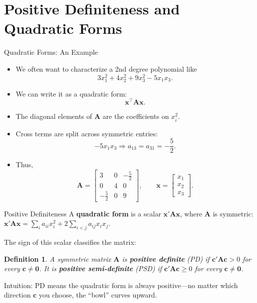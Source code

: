 \documentclass[aspectratio=169, handout, t]{beamer}
\newtheorem{defn}{Definition}
\numberwithin{equation}{section}
\begin{document}
\section[Pos. Definite]{Positive Definiteness and Quadratic Forms}


\begin{frame}{Quadratic Forms: An Example}
\begin{itemize}
\item We often want to characterize a 2nd degree polynomial like
\[
3x_1^2 + 4x_2^2 + 9x_3^2 - 5x_1x_3.
\]

\item We can write it as a quadratic form:
\[
\bm{x}^\top \bm{A} \bm{x}.
\]

\item The diagonal elements of $\bm{A}$ are the coefficients on $x_i^2$.

\item Cross terms are split across symmetric entries:
\[
-5x_1x_3 \Rightarrow a_{13}=a_{31}=-\frac{5}{2}.
\]

\item Thus,
\[
\bm{A}=
\begin{bmatrix}
3 & 0 & -\frac{5}{2} \\
0 & 4 & 0 \\
-\frac{5}{2} & 0 & 9
\end{bmatrix},
\qquad
\bm{x}=
\begin{bmatrix}
x_1\\
x_2\\
x_3
\end{bmatrix}.
\]

\end{itemize}
\end{frame}

\begin{frame}{Positive Definiteness}
A \textbf{quadratic form} is a scalar $\bm{x}'\bm{A}\bm{x}$, where $\bm{A}$ is symmetric:
$\bm{x}'\bm{A}\bm{x}=\sum_i a_{ii}x_i^2+2\sum_{i<j} a_{ij}x_ix_j.$\pause

The sign of this scalar classifies the matrix:
\begin{defn}
A symmetric matrix $\bm{A}$ is \textbf{positive definite} (PD) if
$\bm{c}'\bm{A}\bm{c}>0$ for every $\bm{c}\neq \bm{0}$.
It is \textbf{positive semi-definite} (PSD) if
$\bm{c}'\bm{A}\bm{c}\geq 0$ for every $\bm{c}\neq \bm{0}$.
\end{defn}\pause
Intuition: PD means the quadratic form is always positive---no matter which direction $\bm{c}$ you choose, the ``bowl'' curves upward.
\end{frame}
\end{document}
